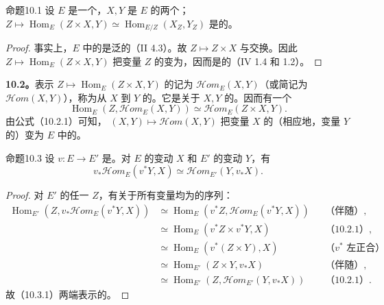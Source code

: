 \begin{SGAresult}{命题}{10.1}
设 $E$ 是一个，$X,Y$ 是 $E$ 的两个；
$Z\mapsto\operatorname{Hom}_E(Z\times X,Y)\simeq\operatorname{Hom}_{E/Z}(X_Z,Y_Z)$ 是的。
\end{SGAresult}
\begin{proof}
事实上，$E$ 中的是泛的（II 4.3）。故 $Z\mapsto Z\times X$ 与交换。因此 $Z\mapsto\operatorname{Hom}_E(Z\times X,Y)$ 把变量 $Z$ 的变为，因而是的（IV 1.4 和 1.2）。
\end{proof}
\textbf{10.2。}表示 $Z\mapsto\operatorname{Hom}_E(Z\times X,Y)$ 的记为 $\mathscr{H}\!om_E(X,Y)$（或简记为 $\mathscr{H}\!om(X,Y)$），称为从 $X$ 到 $Y$ 的。它是关于 $X,Y$ 的。因而有一个
\[
\operatorname{Hom}_E(Z,\mathscr{H}\!om_E(X,Y))\simeq\mathscr{H}\!om_E(Z\times X,Y).\tag{10.2.1}
\]
由公式（10.2.1）可知， $(X,Y)\mapsto\mathscr{H}\!om(X,Y)$ 把变量 $X$ 的（相应地，变量 $Y$ 的）变为 $E$ 中的。
\begin{SGAresult}{命题}{10.3}
设 $v:E\to E'$ 是。对 $E$ 的变动 $X$ 和 $E'$ 的变动 $Y$，有
\[
v_*\mathscr{H}\!om_E(v^*Y,X)\simeq\mathscr{H}\!om_{E'}(Y,v_*X).\tag{10.3.1}
\]
\end{SGAresult}
\begin{proof}
对 $E'$ 的任一 $Z$，有关于所有变量均为的序列：
\begin{align*}
\operatorname{Hom}_{E'}(Z,v_*\mathscr{H}\!om_E(v^*Y,X))
&\simeq\operatorname{Hom}_E(v^*Z,\mathscr{H}\!om_E(v^*Y,X)) &&\text{（伴随）},\\
&\simeq\operatorname{Hom}_E(v^*Z\times v^*Y,X)&&\text{（10.2.1）},\\
&\simeq\operatorname{Hom}_E(v^*(Z\times Y),X)&&\text{（$v^*$ 左正合）},\\
&\simeq\operatorname{Hom}_{E'}(Z\times Y,v_*X)&&\text{（伴随）},\\
&\simeq\operatorname{Hom}_{E'}(Z,\mathscr{H}\!om_{E'}(Y,v_*X))&&\text{（10.2.1）}.
\end{align*}
故（10.3.1）两端表示的。
\end{proof}
